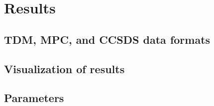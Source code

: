 \chapter{Results}\label{chap:results}

\section{TDM, MPC, and CCSDS data formats}\label{sec:tdm_ccsds}

\section{Visualization of results}\label{sec:visualization}

\section{Parameters}\label{sec:parameters}